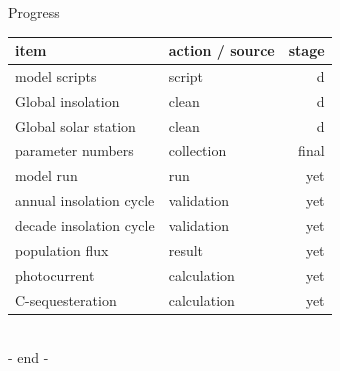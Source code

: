\documentclass[xcolor=x11names,compress]{beamer}
\begin{document}
\begin{frame}{Progress}
    \begin{center}
        \begin{tabular}{l|lr}
            item & action / source & stage \\\hline
            model scripts & script &  d \\
            Global insolation & clean & d \\
            Global solar station & clean & d \\
            parameter numbers & collection & final \\
            model run & run & yet \\
            annual insolation cycle & validation & yet \\
            decade insolation cycle & validation & yet \\
            population flux & result & yet \\
            photocurrent & calculation & yet \\
            C-sequesteration & calculation & yet
        \end{tabular}\\
        \vspace{1cm}
        - end -
    \end{center}
\end{frame}
\end{document}
